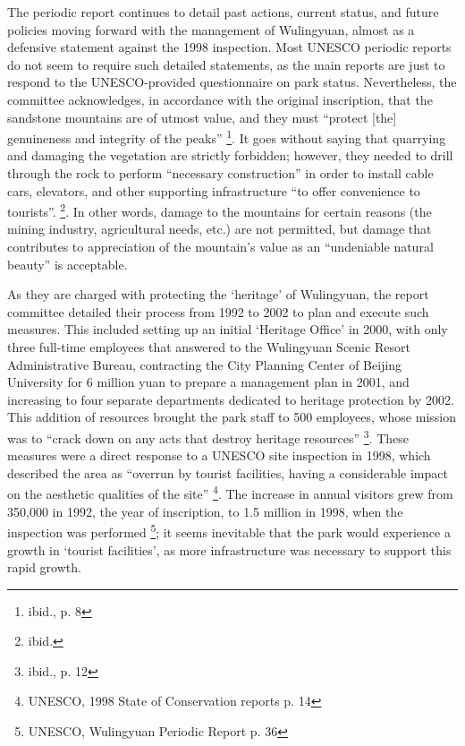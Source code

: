 The periodic report continues to detail past actions, current status, and
future policies moving forward with the management of Wulingyuan, almost
as a defensive statement against the 1998 inspection. Most UNESCO periodic
reports do not seem to require such detailed statements,
as the main reports are just to respond to the UNESCO-provided questionnaire on
park status. Nevertheless, the committee acknowledges, in accordance with
the original inscription, that the sandstone mountains are of utmost
value, and they must ``protect [the] genuineness and integrity of the peaks'' \footnote{ibid., p. 8}.
It goes without saying that quarrying and damaging the vegetation are strictly
forbidden; however, they needed to drill through the rock to perform ``necessary
construction'' in order to install cable cars, elevators, and other
supporting infrastructure ``to offer convenience to tourists''. \footnote{ibid.}.
In other words, damage to the mountains for certain reasons (the mining
industry, agricultural needs, etc.) are not permitted, but damage that
contributes to appreciation of the mountain's value as an ``undeniable natural beauty''
is acceptable.

As they are charged with protecting the `heritage' of Wulingyuan, the report
committee detailed their process from 1992 to 2002 to plan and execute such
measures. This included setting up an initial `Heritage Office' in 2000,
with only three full-time employees that answered to the Wulingyuan Scenic Resort
Administrative Bureau, contracting the City Planning Center of Beijing
University for 6 million yuan to prepare a management plan in 2001, and
increasing to four separate departments dedicated to heritage protection by
2002. This addition of resources brought the park staff to 500 employees, whose mission was
to ``crack down on any acts that destroy heritage resources'' \footnote{ibid.,
p. 12}. These measures were a direct response to a UNESCO site inspection
in 1998, which described the area as ``overrun by tourist facilities, having a
considerable impact on the aesthetic qualities of the site'' \footnote{UNESCO,
1998 State of Conservation reports p. 14}. The increase in annual visitors grew from
350,000 in 1992, the year of inscription, to 1.5 million in 1998, when the
inspection was performed \footnote{UNESCO, Wulingyuan Periodic Report p. 36};
it seems inevitable that the park would experience a growth in
`tourist facilities', as more infrastructure was necessary to support this rapid growth.

